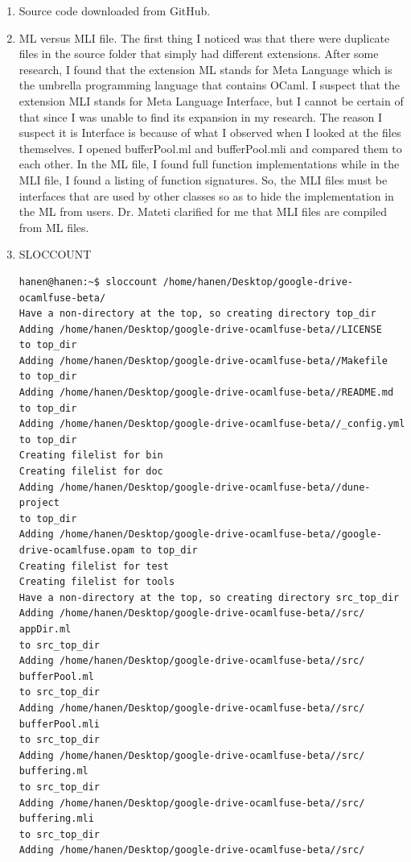   \begin{enumerate}
  \item Source code downloaded from GitHub. \cite{gdriveocamlfuse}
  \item ML versus MLI file. The first thing I noticed was that there were duplicate files in the source folder that simply had
    different extensions. After some research, I found that the
    extension ML stands for Meta Language which is the umbrella
    programming language that contains OCaml. I suspect that the
    extension MLI stands for Meta Language Interface, but I cannot be
    certain of that since I was unable to find its expansion in my
    research. The reason I suspect it is Interface is because of what
    I observed when I looked at the files themselves.  I opened
    bufferPool.ml and bufferPool.mli and compared them to each
    other. In the ML file, I found full function implementations while
    in the MLI file, I found a listing of function signatures. So, the
    MLI files must be interfaces that are used by other classes so as
    to hide the implementation in the ML from users. Dr. Mateti clarified for me that MLI files are compiled from ML files.
  \item SLOCCOUNT
  \begin{verbatim}
hanen@hanen:~$ sloccount /home/hanen/Desktop/google-drive-
ocamlfuse-beta/
Have a non-directory at the top, so creating directory top_dir
Adding /home/hanen/Desktop/google-drive-ocamlfuse-beta//LICENSE
to top_dir
Adding /home/hanen/Desktop/google-drive-ocamlfuse-beta//Makefile
to top_dir
Adding /home/hanen/Desktop/google-drive-ocamlfuse-beta//README.md
to top_dir
Adding /home/hanen/Desktop/google-drive-ocamlfuse-beta//_config.yml
to top_dir
Creating filelist for bin
Creating filelist for doc
Adding /home/hanen/Desktop/google-drive-ocamlfuse-beta//dune-project
to top_dir
Adding /home/hanen/Desktop/google-drive-ocamlfuse-beta//google-
drive-ocamlfuse.opam to top_dir
Creating filelist for test
Creating filelist for tools
Have a non-directory at the top, so creating directory src_top_dir
Adding /home/hanen/Desktop/google-drive-ocamlfuse-beta//src/
appDir.ml
to src_top_dir
Adding /home/hanen/Desktop/google-drive-ocamlfuse-beta//src/
bufferPool.ml
to src_top_dir
Adding /home/hanen/Desktop/google-drive-ocamlfuse-beta//src/
bufferPool.mli
to src_top_dir
Adding /home/hanen/Desktop/google-drive-ocamlfuse-beta//src/
buffering.ml
to src_top_dir
Adding /home/hanen/Desktop/google-drive-ocamlfuse-beta//src/
buffering.mli
to src_top_dir
Adding /home/hanen/Desktop/google-drive-ocamlfuse-beta//src/

\end{verbatim}
\end{enumerate}

